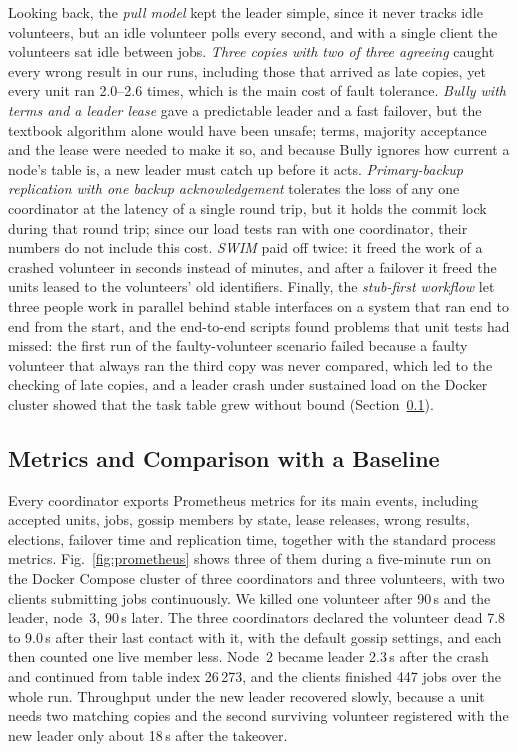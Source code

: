 Looking back, the \emph{pull model} kept the leader simple, since it never tracks idle volunteers, but an idle volunteer polls every second, and with a single client the volunteers sat idle between jobs. \emph{Three copies with two of three agreeing} caught every wrong result in our runs, including those that arrived as late copies, yet every unit ran 2.0--2.6 times, which is the main cost of fault tolerance. \emph{Bully with terms and a leader lease} gave a predictable leader and a fast failover, but the textbook algorithm alone would have been unsafe; terms, majority acceptance and the lease were needed to make it so, and because Bully ignores how current a node's table is, a new leader must catch up before it acts. \emph{Primary-backup replication with one backup acknowledgement} tolerates the loss of any one coordinator at the latency of a single round trip, but it holds the commit lock during that round trip; since our load tests ran with one coordinator, their numbers do not include this cost. \emph{SWIM} paid off twice: it freed the work of a crashed volunteer in seconds instead of minutes, and after a failover it freed the units leased to the volunteers' old identifiers. Finally, the \emph{stub-first workflow} let three people work in parallel behind stable interfaces on a system that ran end to end from the start, and the end-to-end scripts found problems that unit tests had missed: the first run of the faulty-volunteer scenario failed because a faulty volunteer that always ran the third copy was never compared, which led to the checking of late copies, and a leader crash under sustained load on the Docker cluster showed that the task table grew without bound (Section~\ref{sec:metrics}).

\subsection{Metrics and Comparison with a Baseline}
\label{sec:metrics}
Every coordinator exports Prometheus metrics for its main events, including accepted units, jobs, gossip members by state, lease releases, wrong results, elections, failover time and replication time, together with the standard process metrics. Fig.~\ref{fig:prometheus} shows three of them during a five-minute run on the Docker Compose cluster of three coordinators and three volunteers, with two clients submitting jobs continuously. We killed one volunteer after 90\,s and the leader, node~3, 90\,s later. The three coordinators declared the volunteer dead 7.8 to 9.0\,s after their last contact with it, with the default gossip settings, and each then counted one live member less. Node~2 became leader 2.3\,s after the crash and continued from table index 26\,273, and the clients finished 447 jobs over the whole run. Throughput under the new leader recovered slowly, because a unit needs two matching copies and the second surviving volunteer registered with the new leader only about 18\,s after the takeover.

